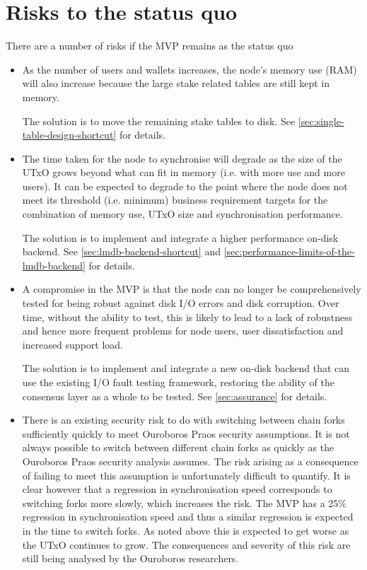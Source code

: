 \documentclass[11pt,a4paper]{article}
\begin{document}
\section{Risks to the status quo}

There are a number of risks if the MVP remains as the status quo
\begin{itemize}
\item As the number of users and wallets increases, the node's memory use (RAM)
      will also increase because the large stake related tables are still kept
      in memory.

      The solution is to move the remaining stake tables to disk.
      See \cref{sec:single-table-design-shortcut} for details.

\item The time taken for the node to synchronise will degrade as the size of
      the UTxO grows beyond what can fit in memory (i.e. with more use and more
      users). It can be expected to degrade to the point where the node does
      not meet its threshold (i.e. minimum) business requirement targets for
      the combination of memory use, UTxO size and synchronisation performance.

      The solution is to implement and integrate a higher performance on-disk
      backend. See \cref{sec:lmdb-backend-shortcut}
      and \cref{sec:performance-limits-of-the-lmdb-backend} for details.

\item A compromise in the MVP is that the node can no longer be comprehensively
      tested for being robust against disk I/O errors and disk corruption. Over
      time, without the ability to test, this is likely to lead to a lack of
      robustness and hence more frequent problems for node users, user
      dissatisfaction and increased support load.

      The solution is to implement and integrate a new on-disk backend that can
      use the existing I/O fault testing framework, restoring the ability of
      the consensus layer as a whole to be tested. See \cref{sec:assurance}
      for details.

\item There is an existing security risk to do with switching between chain
      forks sufficiently quickly to meet Ouroboros Praos security assumptions.
      It is not always possible to switch between different chain forks as
      quickly as the Ouroboros Praos security analysis assumes. The risk
      arising as a consequence of failing to meet this assumption is
      unfortunately difficult to quantify. It is clear however that a
      regression in synchronisation speed corresponds to switching forks more
      slowly, which increases the risk. The MVP has a 25\% regression in
      synchronisation speed and thus a similar regression is expected in the
      time to switch forks. As noted above this is expected to get worse as the
      UTxO continues to grow. The consequences and severity of this risk are
      still being analysed by the Ouroboros researchers.


\end{itemize}
\end{document}

